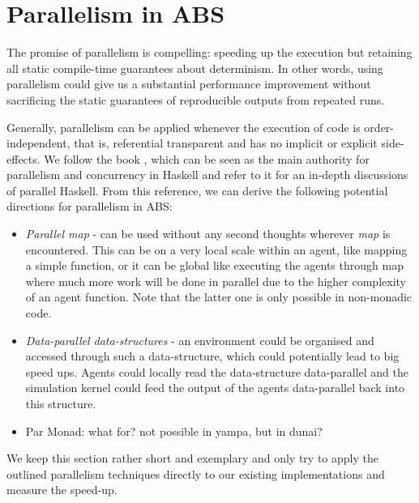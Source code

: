 \section{Parallelism in ABS}
The promise of parallelism is compelling: speeding up the execution but retaining all static compile-time guarantees about determinism. In other words, using parallelism could give us a substantial performance improvement without sacrificing the static guarantees of reproducible outputs from repeated runs.

Generally, parallelism can be applied whenever the execution of code is order-independent, that is, referential transparent and has no implicit or explicit side-effects. We follow the book \cite{marlow_parallel_2013}, which can be seen as the main authority for parallelism and concurrency in Haskell and refer to it for an in-depth discussions of parallel Haskell. From this reference, we can derive the following potential directions for parallelism in ABS:

\begin{itemize}
	\item \textit{Parallel map} - can be used without any second thoughts wherever \textit{map} is encountered. This can be on a very local scale within an agent, like mapping a simple function, or it can be global like executing the agents through map where much more work will be done in parallel due to the higher complexity of an agent function. Note that the latter one is only possible in non-monadic code.
	
	\item \textit{Data-parallel data-structures} - an environment could be organised and accessed through such a data-structure, which could potentially lead to big speed ups. Agents could locally read the data-structure data-parallel and the simulation kernel could feed the output of the agents data-parallel back into this structure.
	
	\item Par Monad: what for? not possible in yampa, but in dunai?
\end{itemize}

We keep this section rather short and exemplary and only try to apply the outlined parallelism techniques directly to our existing implementations and measure the speed-up. 










